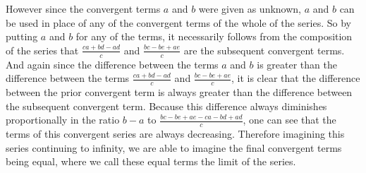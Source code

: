 \documentclass[11pt,letterpaper]{book}
\begin{document}
However since the convergent terms $a$ and $b$ were given as unknown, $a$
and $b$ can be used in place of any of the convergent
terms of the whole of the series. So by putting $a$ and $b$ for any of the
terms, it necessarily follows from the composition of the
series that $\frac{ca+bd-ad}{c}$ and $\frac{bc-be+ae}{c}$ are the subsequent
convergent terms. And again since the difference between the terms $a$
and $b$ is greater than the difference between the terms $\frac{ca+bd-ad}{c}$
and $\frac{bc-be+ae}{c}$, it is clear that the difference between the
prior convergent term is always greater than the difference between the
subsequent convergent term. Because this difference always diminishes
proportionally in the ratio $b - a$ to $\frac{bc - be + ae - ca - bd +
ad}{c}$, one can see that the terms of this convergent series are always
decreasing. Therefore imagining this series continuing to infinity, we are able
to imagine the final convergent terms being equal, where we call these equal terms
the limit of the series.

\end{document}
